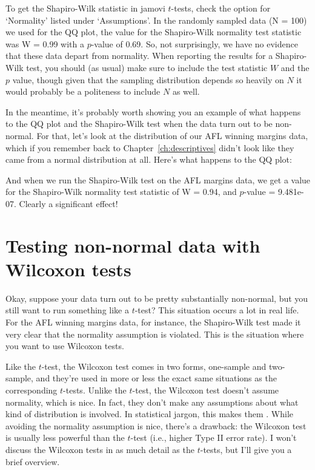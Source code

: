To get the Shapiro-Wilk statistic in jamovi $t$-tests, check the option for `Normality' listed under `Assumptions'. In the randomly sampled data (N = 100) we used for the QQ plot, the value for the Shapiro-Wilk normality test statistic was W = 0.99 with a $p$-value of 0.69. So, not surprisingly, we have no evidence that these data depart from normality. When reporting the results for a Shapiro-Wilk test, you should (as usual) make sure to include the test statistic $W$ and the $p$ value, though given that the sampling distribution depends so heavily on $N$ it would probably be a politeness to include $N$ as well.


In the meantime, it's probably worth showing you an example of what happens to the QQ plot and the Shapiro-Wilk test when the data turn out to be non-normal. For that, let's look at the distribution of our AFL winning margins data, which if you remember back to Chapter~\ref{ch:descriptives} didn't look like they came from a normal distribution at all. Here's what happens to the QQ plot:

\begin{center}
\end{center}

And when we run the Shapiro-Wilk test on the AFL margins data, we get a value for the Shapiro-Wilk normality test statistic of W = 0.94, and $p$-value = 9.481e-07. Clearly a significant effect!


\section{Testing non-normal data with Wilcoxon tests\label{sec:wilcox}}

Okay, suppose your data turn out to be pretty substantially non-normal, but you still want to run something like a $t$-test? This situation occurs a lot in real life. For the AFL winning margins data, for instance, the Shapiro-Wilk test made it very clear that the normality assumption is violated. This is the situation where you want to use Wilcoxon tests. 

Like the $t$-test, the Wilcoxon test comes in two forms, one-sample and two-sample, and they're used in more or less the exact same situations as the corresponding $t$-tests. Unlike the $t$-test, the Wilcoxon test doesn't assume normality, which is nice. In fact, they don't make any assumptions about what kind of distribution is involved. In statistical jargon, this makes them . While avoiding the normality assumption is nice, there's a drawback: the Wilcoxon test is usually less powerful than the $t$-test (i.e., higher Type II error rate). I won't discuss the Wilcoxon tests in as much detail as the $t$-tests, but I'll give you a brief overview.

